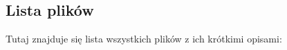 \subsection{Lista plików}
Tutaj znajduje się lista wszystkich plików z ich krótkimi opisami\+:\begin{DoxyCompactList}
\item{}
\end{DoxyCompactList}
